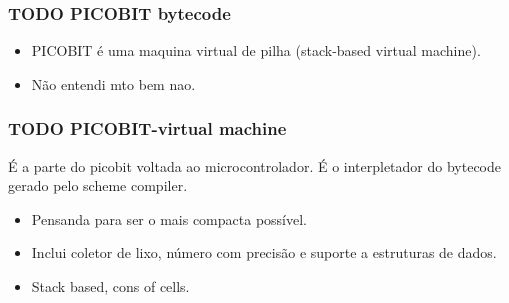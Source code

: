 \documentclass[11pt]{article}
\begin{document}
\subsubsection{{\bfseries\sffamily TODO} PICOBIT bytecode}
\label{sec-1-2-2}

\begin{itemize}
\item PICOBIT é uma maquina virtual de pilha (stack-based virtual machine).
\item Não entendi mto bem nao.
\end{itemize}

\subsubsection{{\bfseries\sffamily TODO} PICOBIT-virtual machine}
\label{sec-1-2-3}

É a parte do picobit voltada ao microcontrolador. É o interpletador do bytecode gerado pelo scheme compiler.

\begin{itemize}
\item Pensanda para ser o mais compacta possível.
\item Inclui coletor de lixo, número com precisão e suporte a estruturas de dados.
\item Stack based, cons of cells.
\end{itemize}
\end{document}
